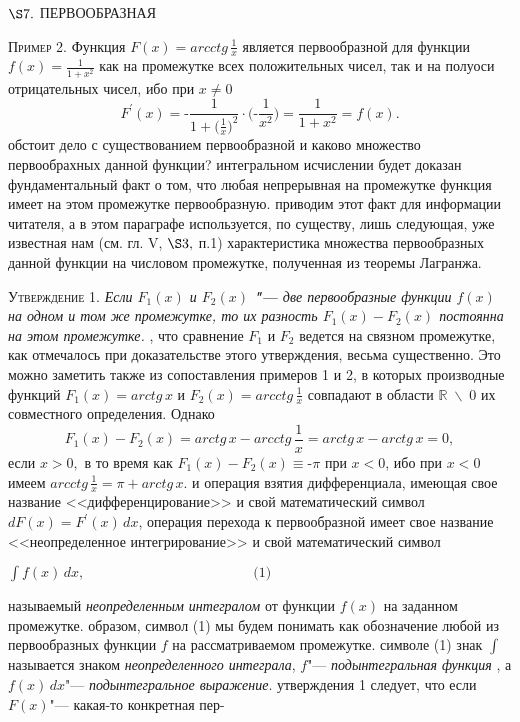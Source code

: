 \documentclass[a5paper, 16pt]{book}
\date{09.03.2023}
\author{Егор Потапов}
\begin{document}
    \begin{center}
        $\S7.$ \textsc{ПЕРВООБРАЗНАЯ}
    \end{center}
    \par\textsc{Пример 2.} Функция $F(x) = arcctg \, \frac{1}{x}$ является первообразной для функции $f(x) = \frac{1}{1 + x ^ {2}}$ как на промежутке всех положительных чисел, так и на полуоси отрицательных чисел, ибо при $x \neq 0$
    $$F^{'} (x) = \textbf{-} \frac{1}{1 + \big(\frac{1}{x} \big)^{2}} \cdot \bigg( \textbf{-} \frac{1}{x ^ {2}} \bigg) = \frac{1}{1 + x ^ {2}} = f(x) .$$
     обстоит дело с существованием первообразной и каково множество первообрахных данной функции?
     интегральном исчислении будет доказан фундаментальный факт о том, что любая непрерывная на промежутке функция имеет на этом промежутке первообразную.
     приводим этот факт для информации читателя, а в этом параграфе используется, по существу, лишь следующая, уже известная нам (см. гл. V, $\S3,$ п.1) характеристика множества первообразных данной функции на числовом промежутке, полученная из теоремы Лагранжа.
    \par\textsc{Утверждение 1.} \textit{Если $F_1(x)$ и $F_2(x)$ \textbf{"---} две первообразные функции $f(x)$ на одном и том же промежутке, то их разность $F_1(x) - F_2(x)$ постоянна на этом промежутке.}
    , что сравнение $F_1$ и $F_2$ ведется на связном промежутке, как отмечалось при доказательстве этого утверждения, весьма существенно. Это можно заметить также из сопоставления примеров 1 и 2, в которых производные функций $F_1(x) = arctg \, x$ и $F_2(x) = arcctg \, \frac{1}{x}$ совпадают в области $\mathbb{R} \; \backslash \; 0$ их совместного определения. Однако
    $$F_1(x) - F_2(x) = arctg \, x - arcctg \, \frac{1}{x} = arctg \, x - arctg \, x = 0 ,$$
    если $x > 0 ,$ в то время как $F_1(x) - F_2(x) \equiv \textbf{-} \pi$ при $x < 0$, ибо при $x < 0$ имеем $arcctg \, \frac{1}{x} = \pi + arctg \, x .$
     и операция взятия дифференциала, имеющая свое название <<дифференцирование>> и свой математический символ $dF(x) = F ^ {'} (x) \, dx$, операция перехода к первообразной имеет свое название <<неопределенное интегрирование>> и свой математический символ
    \begin{flushright}
        $\int f(x) \, dx, \qquad \qquad \qquad \qquad \qquad \qquad \textrm{(1)}$
    \end{flushright}
    называемый \textit{неопределенным интегралом} от функции $f(x)$ на заданном промежутке.
     образом, символ (1) мы будем понимать как обозначение любой из первообразных функции $f$ на рассматриваемом промежутке.
     символе (1) знак $\int$ называется знаком \textit{неопределенного интеграла}, $f \textbf{"---}$ \textit{подынтегральная функция} , а $f(x) \, dx \textbf{"---}$ \textit{подынтегральное выражение}.
     утверждения 1 следует, что если $F(x) \textbf{"---}$ какая-то конкретная пер-
\end{document}
